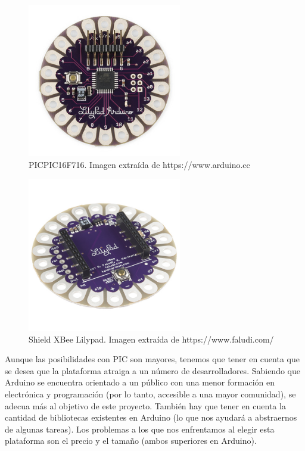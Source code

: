 \begin{description}
\begin{itemize}
    \end{itemize}
    \begin{figure}[!htb]
    \centering
    \includegraphics[width=0.6\textwidth]{./imagenes/lilypad}
    \caption{PICPIC16F716. Imagen extraída de \scriptsize{https://www.arduino.cc}} \label{fig:lilypad}
    \end{figure}
    \begin{figure}[htb]
    \centering
    \includegraphics[width=0.6\textwidth]{./imagenes/lilypadxbee}
    \caption{Shield XBee Lilypad. Imagen extraída de \scriptsize{https://www.faludi.com/ \cite{faludi}}} \label{fig:lilypadxbee}
    \end{figure}
\end{description}


\clearpage

Aunque las posibilidades con PIC son mayores, tenemos que tener en cuenta que se desea que la
plataforma atraiga a un número de desarrolladores. Sabiendo que Arduino se encuentra orientado a un
público con una menor formación en electrónica y programación (por lo tanto, accesible a una mayor comunidad), se
adecua más al objetivo de este proyecto. También hay que tener en cuenta la cantidad de bibliotecas
existentes en Arduino (lo que nos ayudará a abstraernos de algunas tareas). Los problemas a los que
nos enfrentamos al elegir esta plataforma son el precio y el tamaño (ambos superiores en Arduino).\\

